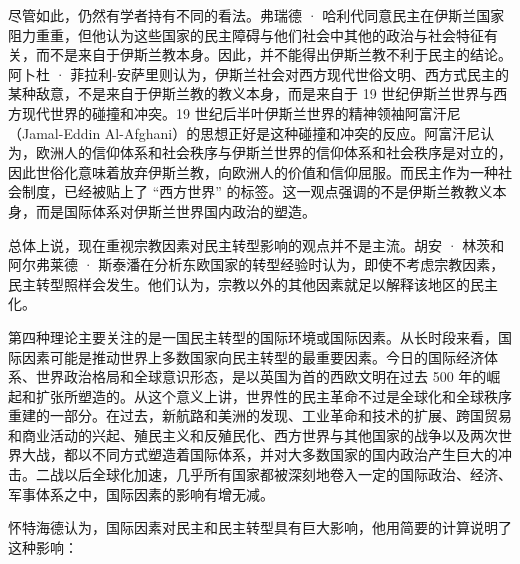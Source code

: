 尽管如此，仍然有学者持有不同的看法。弗瑞德 · 哈利代同意民主在伊斯兰国家阻力重重，但他认为这些国家的民主障碍与他们社会中其他的政治与社会特征有关，而不是来自于伊斯兰教本身。因此，并不能得出伊斯兰教不利于民主的结论。阿卜杜 · 菲拉利-安萨里则认为，伊斯兰社会对西方现代世俗文明、西方式民主的某种敌意，不是来自于伊斯兰教的教义本身，而是来自于 19 世纪伊斯兰世界与西方现代世界的碰撞和冲突。19 世纪后半叶伊斯兰世界的精神领袖阿富汗尼（Jamal-Eddin Al-Afghani）的思想正好是这种碰撞和冲突的反应。阿富汗尼认为，欧洲人的信仰体系和社会秩序与伊斯兰世界的信仰体系和社会秩序是对立的，因此世俗化意味着放弃伊斯兰教，向欧洲人的价值和信仰屈服。而民主作为一种社会制度，已经被贴上了 “西方世界” 的标签。这一观点强调的不是伊斯兰教教义本身，而是国际体系对伊斯兰世界国内政治的塑造。

总体上说，现在重视宗教因素对民主转型影响的观点并不是主流。胡安 · 林茨和阿尔弗莱德 · 斯泰潘在分析东欧国家的转型经验时认为，即使不考虑宗教因素，民主转型照样会发生。他们认为，宗教以外的其他因素就足以解释该地区的民主化。


第四种理论主要关注的是一国民主转型的国际环境或国际因素。从长时段来看，国际因素可能是推动世界上多数国家向民主转型的最重要因素。今日的国际经济体系、世界政治格局和全球意识形态，是以英国为首的西欧文明在过去 500 年的崛起和扩张所塑造的。从这个意义上讲，世界性的民主革命不过是全球化和全球秩序重建的一部分。在过去，新航路和美洲的发现、工业革命和技术的扩展、跨国贸易和商业活动的兴起、殖民主义和反殖民化、西方世界与其他国家的战争以及两次世界大战，都以不同方式塑造着国际体系，并对大多数国家的国内政治产生巨大的冲击。二战以后全球化加速，几乎所有国家都被深刻地卷入一定的国际政治、经济、军事体系之中，国际因素的影响有增无减。

怀特海德认为，国际因素对民主和民主转型具有巨大影响，他用简要的计算说明了这种影响：


